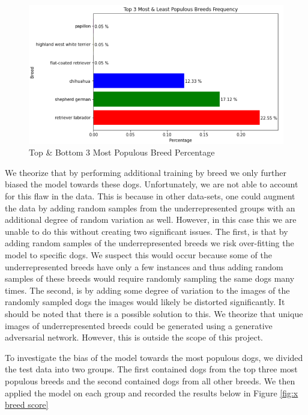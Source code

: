 \documentclass{article}
\begin{document}
\begin{enumerate}
\begin{figure}[]
\centering
	\includegraphics[scale=0.7]{final-report-images/breed_distr.png}
\caption{Top \& Bottom 3 Most Populous Breed Percentage}
\label{fig:x breed distr}
\end{figure}

\newpage

We theorize that by performing additional training by breed we only further biased the model towards these dogs.  Unfortunately, we are not able to account for this flaw in the data.  This is because in other data-sets, one could augment the data by adding random samples from the underrepresented groups with an additional degree of random variation as well.  However, in this case this we are unable to do this without creating two significant issues.  The first, is that by adding random samples of the underrepresented breeds we risk over-fitting the model to specific dogs.  We suspect this would occur because some of the underrepresented breeds have only a few instances and thus adding random samples of these breeds would require randomly sampling the same dogs many times.  The second, is by adding some degree of variation to the images of the randomly sampled dogs the images would likely be distorted significantly.  It should be noted that there is a possible solution to this.  We theorize that unique images of underrepresented breeds could be generated using a generative adversarial network.  However, this is outside the scope of this project.

To investigate the bias of the model towards the most populous dogs, we divided the test data into two groups.  The first contained dogs from the top three most populous breeds and the second contained dogs from all other breeds.  We then applied the model on each group and recorded the results below in Figure \ref{fig:x breed score}



\end{enumerate}
\end{document}
